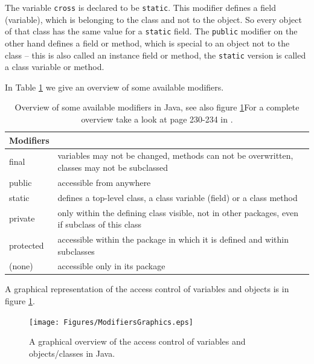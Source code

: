 The variable \verb|cross| is declared to be \verb|static|.  This
modifier 
defines a field (variable), which is belonging
to the class and not to the object. So every object of that class 
has the same value for a \verb|static| field. The \verb|public| modifier
on the other hand defines a field or method, which is special to 
an object not to the class -- this is also called an instance field or
method, the \verb|static| version is called a class variable or
method.

In Table \ref{tab:modifiers} we give an overview of some available modifiers.
\begin{table}[htbp]
  \begin{center}
    \leavevmode
    \begin{tabular}{l|p{8cm}}
     Modifiers &                                 \\ \hline \hline
     final & variables may not be changed, methods can not be overwritten,
             classes may not be subclassed\\\hline
     public & accessible from anywhere\\ \hline
     static & defines a top-level class, a class variable (field) or 
                 a class method\\\hline
     private & only within the defining class visible, not in other 
               packages, even if subclass of this class\\\hline
     protected & accessible within the package in which it is defined and
                 within subclasses\\\hline
     (none) & accessible only in its package\\
    \end{tabular}
    \caption{Overview of some available modifiers in Java, see also figure
      \ref{fig:ModifiersGraphics}For a complete
      overview take a look at page 230-234 in \cite{javanutshell}.}
    \label{tab:modifiers}
  \end{center}
\end{table}
A graphical representation of the access control of variables and
objects is in figure \ref{fig:ModifiersGraphics}.
\begin{figure}[htbp]
  \begin{center}
    \texttt{[image: Figures/ModifiersGraphics.eps]}
    \caption{A graphical overview of the access control of variables and objects/classes in Java.}
    \label{fig:ModifiersGraphics}
  \end{center}
\end{figure}

